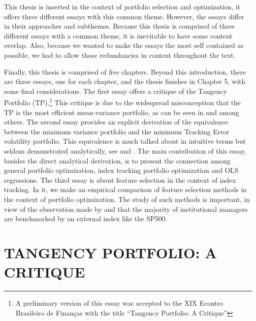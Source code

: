 \documentclass[12pt,oneside,a4paper]{memoir}
\begin{document}
This thesis is inserted in the context of portfolio selection and optimization, it offers three different essays with this common theme.
However, the essays differ in their approaches and subthemes.
Because this thesis is comprised of three different essays with a common theme, it is inevitable to have some content overlap.
Also, because we wanted to make the essays the most self contained as possible, we had to allow those redundancies in content throughout the text.

Finally, this thesis is comprised of five chapters.
Beyond this introduction, there are three essays, one for each chapter, and the thesis finishes in Chapter 5, with some final considerations.
The first essay offers a critique of the Tangency Portfolio (TP).\footnote{A preliminary version of this essay was accepted to the XIX Econtro Brasileiro de Finanças with the title ``Tangency Portfolio: A Critique''}
This critique is due to the widespread misconception that the TP is the most efficient mean-variance portfolio, as can be seen in  and  among others.
The second essay provides an explicit derivation of the equivalence between the minimum variance portfolio and the minimum Tracking Error volatility portfolio.
This equivalence is much talked about in intuitive terms but seldom demonstrated analytically, see  and .
The main contribution of this essay, besides the direct analytical derivation, is to present the connection among general portfolio optimization, index tracking portfolio optimization and OLS regressions.
The third essay is about feature selection in the context of index tracking.
In it, we make an empirical comparison of feature selection methods in the context of portfolio optimization.
The study of such methods is important, in view of the observation made by  and  that the majority of institutional managers are benchmarked by an external index like the SP500.


\chapter{TANGENCY PORTFOLIO: A CRITIQUE}
\end{document}

